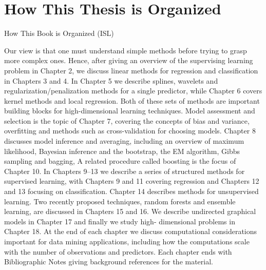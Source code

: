 \section{How This Thesis is Organized}

How This Book is Organized (ISL)

Our view is that one must understand simple methods before trying to grasp more complex ones. Hence, after giving an overview of the supervising learning problem in Chapter 2, we discuss linear methods for regression and classification in Chapters 3 and 4. In Chapter 5 we describe splines, wavelets and regularization/penalization methods for a single predictor, while Chapter 6 covers kernel methods and local regression. Both of these sets of methods are important building blocks for high-dimensional learning techniques. Model assessment and selection is the topic of Chapter 7, covering the concepts of bias and variance, overfitting and methods such as cross-validation for choosing models. Chapter 8 discusses model inference and averaging, including an overview of maximum likelihood, Bayesian inference and the bootstrap, the EM algorithm, Gibbs sampling and bagging, A related procedure called boosting is the focus of Chapter 10.
In Chapters 9–13 we describe a series of structured methods for supervised learning, with Chapters 9 and 11 covering regression and Chapters 12 and 13 focusing on classification. Chapter 14 describes methods for unsupervised learning. Two recently proposed techniques, random forests and ensemble learning, are discussed in Chapters 15 and 16. We describe undirected graphical models in Chapter 17 and finally we study high- dimensional problems in Chapter 18.
At the end of each chapter we discuss computational considerations important for data mining applications, including how the computations scale with the number of observations and predictors. Each chapter ends with Bibliographic Notes giving background references for the material.